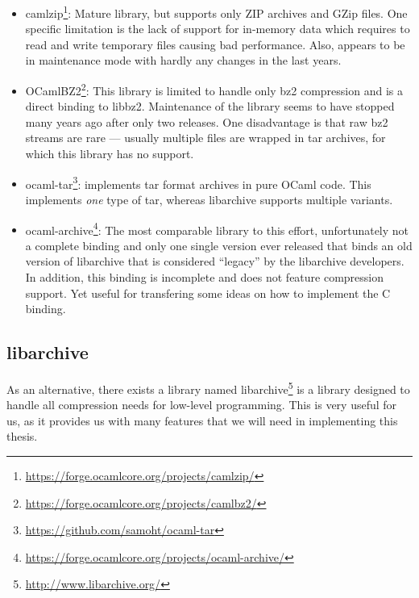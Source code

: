 \documentclass[parskip=half]{scrreprt}
\begin{document}
\begin{itemize}
  \item camlzip\footnote{\url{https://forge.ocamlcore.org/projects/camlzip/}}:
    Mature library, but supports only ZIP archives and GZip files. One specific
    limitation is
    the lack of support for in-memory data which requires to read and write
    temporary files causing bad performance. Also, appears to be in maintenance
    mode with hardly any changes in the last years.
  \item OCamlBZ2\footnote{\url{https://forge.ocamlcore.org/projects/camlbz2/}}:
    This library is limited to handle only bz2 compression and is a direct
    binding to libbz2. Maintenance of the library seems to have stopped many
    years ago after only two releases. One disadvantage is that raw bz2
    streams are rare — usually multiple files are wrapped in tar archives,
    for which this library has no support.
  \item ocaml-tar\footnote{\url{https://github.com/samoht/ocaml-tar}}:
    implements tar format archives in pure OCaml code. This implements
    \emph{one} type of tar, whereas libarchive supports multiple variants.
  \item ocaml-archive\footnote{\url{https://forge.ocamlcore.org/projects/ocaml-archive/}}:
    The most comparable library to this effort, unfortunately not a complete
    binding and only one single version ever released that binds an old version
    of libarchive that is considered \enquote{legacy} by the libarchive
    developers. In addition, this binding is incomplete and does not feature
    compression support. Yet useful for transfering some ideas on how to
    implement the C binding.
\end{itemize}

\subsection{libarchive}
\label{sec:libarchive}

As an alternative, there exists a library named
libarchive\footnote{\url{http://www.libarchive.org/}} is a library designed to
handle all compression needs for low-level programming. This is very useful for
us, as it provides us with many features that we will need in implementing this
thesis.
\end{document}
